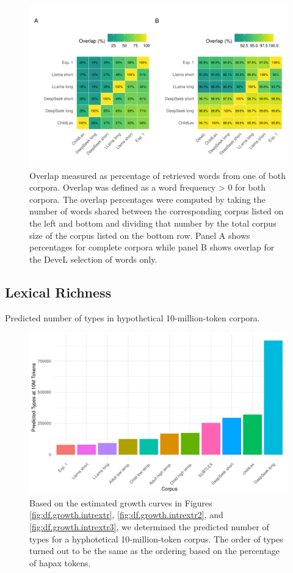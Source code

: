 \documentclass[doc, a4paper, anonymous]{apa7}
\begin{document}
\begin{figure}[!htbp]
    \includegraphics[width = 0.8\paperwidth]{figures/heatmaps-exp3.pdf}
    \caption{Overlap measured as percentage of retrieved words from one of both corpora. Overlap was defined as a word frequency > 0 for both corpora. The overlap percentages were computed by taking the number of words shared between the corresponding corpus listed on the left and bottom and dividing that number by the total corpus size of the corpus listed on the bottom row. Panel A shows percentages for complete corpora while panel B shows overlap for the DeveL selection of words only.}
    \label{fig:heatmaps-exp3}
\end{figure}

\clearpage

\subsection{Lexical Richness}

Predicted number of types in hypothetical 10-million-token corpora.
        
\begin{figure}[!htbp]
    \includegraphics[width = 0.8\paperwidth]{figures/zipfR_extrapolation.pdf}
    \caption{Based on the estimated growth curves in Figures \ref{fig:df.growth.intrextr}, \ref{fig:df.growth.intrextr2}, and \ref{fig:df.growth.intrextr3}, we determined the predicted number of types for a hyphotetical 10-million-token corpus. The order of types turned out to be the same as the ordering based on the percentage of hapax tokens.}
    \label{fig:zipfR_extrapolation}
  \hfill
\end{figure}
\end{document}

